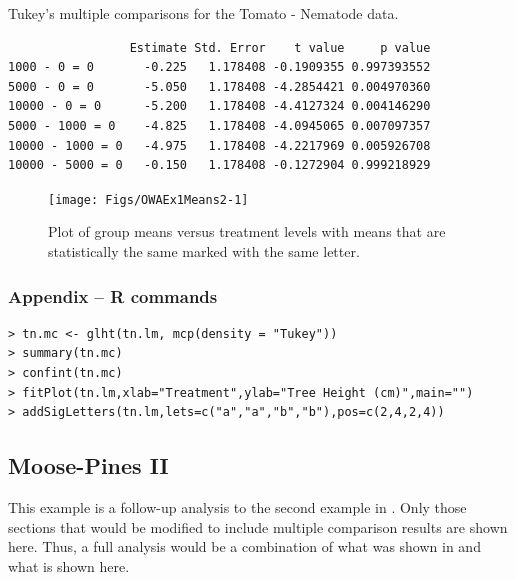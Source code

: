 \documentclass[10pt,openany]{book}\usepackage[]{graphicx}\usepackage[]{color}
\makeatletter
\newenvironment{kframe}{%
 \def\at@end@of@kframe{}%
 \ifinner\ifhmode%
  \def\at@end@of@kframe{\end{minipage}}%
  \begin{minipage}{\columnwidth}%
 \fi\fi%
 \def\FrameCommand##1{\hskip\@totalleftmargin \hskip-\fboxsep
 \colorbox{shadecolor}{##1}\hskip-\fboxsep
     \hskip-\linewidth \hskip-\@totalleftmargin \hskip\columnwidth}%
 \MakeFramed {\advance\hsize-\width
   \@totalleftmargin\z@ \linewidth\hsize
   \@setminipage}}%
 {\par\unskip\endMakeFramed%
 \at@end@of@kframe}
\newenvironment{knitrout}{}{} %
\makeatother
\begin{document}
\begin{table}[h]
  \centering
  \caption{Tukey's multiple comparisons for the Tomato - Nematode data.}\label{tab:OWAEx1HSD}
\begin{knitrout}
\color{fgcolor}\begin{kframe}
\begin{verbatim}
                 Estimate Std. Error    t value     p value
1000 - 0 = 0       -0.225   1.178408 -0.1909355 0.997393552
5000 - 0 = 0       -5.050   1.178408 -4.2854421 0.004970360
10000 - 0 = 0      -5.200   1.178408 -4.4127324 0.004146290
5000 - 1000 = 0    -4.825   1.178408 -4.0945065 0.007097357
10000 - 1000 = 0   -4.975   1.178408 -4.2217969 0.005926708
10000 - 5000 = 0   -0.150   1.178408 -0.1272904 0.999218929
\end{verbatim}
\end{kframe}
\end{knitrout}
\end{table}

\begin{knitrout}
\color{fgcolor}\begin{figure}[hbtp]

{\centering \texttt{[image: Figs/OWAEx1Means2-1]} 

}

\caption[Plot of group means versus treatment levels with means that are statistically the same marked with the same letter]{Plot of group means versus treatment levels with means that are statistically the same marked with the same letter.}\label{fig:OWAEx1Means2}
\end{figure}


\end{knitrout}

\subsubsection*{Appendix -- R commands}
\begin{Verbatim}[formatcom=\color{red},xleftmargin=5mm,commandchars=\\\{\}]
> tn.mc <- glht(tn.lm, mcp(density = "Tukey"))
> summary(tn.mc)
> confint(tn.mc)
> fitPlot(tn.lm,xlab="Treatment",ylab="Tree Height (cm)",main="")
> addSigLetters(tn.lm,lets=c("a","a","b","b"),pos=c(2,4,2,4))
\end{Verbatim}

\subsection{Moose-Pines II}
This example is a follow-up analysis to the second example in .  Only those sections that would be modified to include multiple comparison results are shown here.  Thus, a full analysis would be a combination of what was shown in  and what is shown here.
\end{document}
